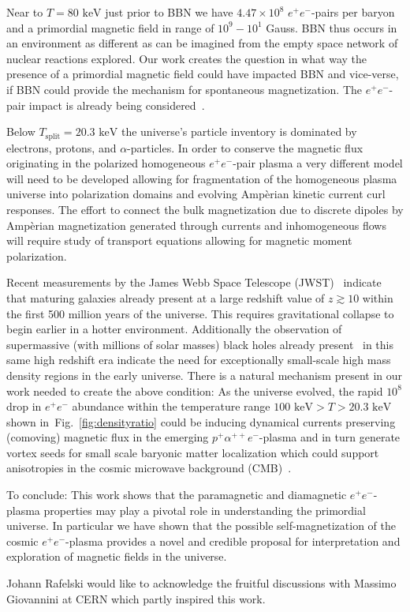 \documentclass[aps,prd,floatfix,reprint]{revtex4-2}
\newcommand*{\keV}{\text{ keV}}
\newcommand{\rf}[1]{Fig.~{\ref{#1}}}
\begin{document}
Near to $T=80\keV$ just prior to BBN we have $4.47\times10^{8}$ $e^{+}e^{-}$-pairs per baryon and a primordial magnetic field in range of $10^{9}-10^{1}$ Gauss. BBN thus occurs in an environment as different as can be imagined from the empty space network of nuclear reactions explored. Our work creates the question in what way the presence of a primordial magnetic field could have impacted BBN and vice-verse, if BBN could provide the mechanism for spontaneous magnetization. The $e^{+}e^{-}$-pair impact is already being considered~\cite{Grayson:2023flr}.

Below $T_\mathrm{split}=20.3\keV$ the universe's particle inventory is dominated by electrons, protons, and $\alpha$-particles. In order to conserve the magnetic flux originating in the polarized homogeneous $e^{+}e^{-}$-pair plasma a very different model will need to be developed allowing for fragmentation of the homogeneous plasma universe into polarization domains and evolving Amp{\`e}rian kinetic current curl responses. The effort to connect the bulk magnetization due to discrete dipoles by Amp{\`e}rian magnetization generated through currents and inhomogeneous flows will require study of transport equations allowing for magnetic moment polarization. 

Recent measurements by the James Webb Space Telescope (JWST)~\cite{Yan:2022sxd,adams2023discovery,arrabal2023spectroscopic} indicate that maturing galaxies already present at a large redshift value of $z\gtrsim10$ within the first 500 million years of the universe. This requires gravitational collapse to begin earlier in a hotter environment. Additionally the observation of supermassive (with millions of solar masses) black holes already present~\cite{CEERSTeam:2023qgy} in this same high redshift era indicate the need for exceptionally small-scale high mass density regions in the early universe. There is a natural mechanism present in our work needed to create the above condition: As the universe evolved, the rapid $10^{8}$ drop in $e^{+}e^{-}$ abundance within the temperature range $100\keV>T>20.3\keV$ shown in~\rf{fig:densityratio} could be inducing dynamical currents preserving (comoving) magnetic flux in the emerging $p^{+}\alpha^{++}e^{-}$-plasma and in turn generate vortex seeds for small scale baryonic matter localization which could support anisotropies in the cosmic microwave background (CMB)~\cite{Jedamzik:2013gua,Abdalla:2022yfr}.

To conclude: This work shows that the paramagnetic and diamagnetic $e^{+}e^{-}$-plasma properties may play a pivotal role in understanding the primordial universe. In particular we have shown that the possible self-magnetization of the cosmic $e^{+}e^{-}$-plasma  provides a novel and credible proposal for interpretation and exploration of magnetic fields in the universe. 


\acknowledgments
\label{sec:ack}
\noindent Johann Rafelski would like to acknowledge the fruitful discussions with Massimo Giovannini at CERN which partly inspired this work.



\end{document}
